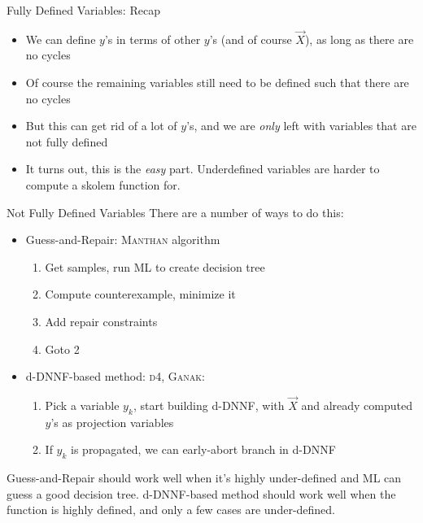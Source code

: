 \documentclass[aspectratio=169]{beamer}
\begin{document}
\begin{frame}{Fully Defined Variables: Recap}
\begin{itemize}
    \item We can define $y$'s in terms of other $y$'s (and of course
        $\vec{X}$), as long as there are no cycles
    \item Of course the remaining variables still need to be defined
        such that there are no cycles
    \item But this can get rid of a lot of $y$'s, and we are \emph{only} left
        with variables that are not fully defined
    \item It turns out, this is the \emph{easy} part. Underdefined
        variables are harder to compute a skolem function for.
\end{itemize}
\end{frame}

\begin{frame}{Not Fully Defined Variables}
There are a number of ways to do this:
\begin{itemize}
    \item Guess-and-Repair: \textsc{Manthan} algorithm
        \begin{enumerate}
            \item Get samples, run ML to create decision tree
            \item Compute counterexample, minimize it
            \item Add repair constraints
            \item Goto 2
        \end{enumerate}
    \item d-DNNF-based method: \textsc{d4}, \textsc{Ganak}:
        \begin{enumerate}
            \item Pick a variable $y_k$, start building d-DNNF, with $\vec{X}$ and
                already computed $y$'s as projection variables
            \item If $y_k$ is propagated, we can early-abort branch in d-DNNF
        \end{enumerate}
\end{itemize}
\bigskip

Guess-and-Repair should work well when it's highly under-defined and ML
can guess a good decision tree. d-DNNF-based method should work well when
the function is highly defined, and only a few cases are under-defined.
\end{frame}
\end{document}
